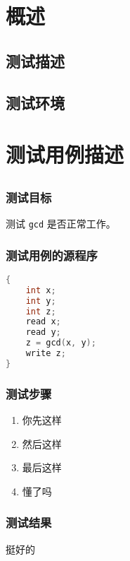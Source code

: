 \documentclass{ctlabreport}
\begin{document}
\section{概述}

\subsection{测试描述}

\subsection{测试环境}

\section{测试用例描述}

\subsection{}

\subsubsection{测试目标}

测试 \lstinline|gcd| 是否正常工作。

\subsubsection{测试用例的源程序}

\begin{lstlisting}[language=C]
{
    int x;
    int y;
    int z;
    read x;
    read y;
    z = gcd(x, y);
    write z;
}
\end{lstlisting}

\subsubsection{测试步骤}

\begin{enumerate}
    \item 你先这样
    \item 然后这样
    \item 最后这样
    \item 懂了吗
\end{enumerate}

\subsubsection{测试结果}

挺好的
\end{document}
